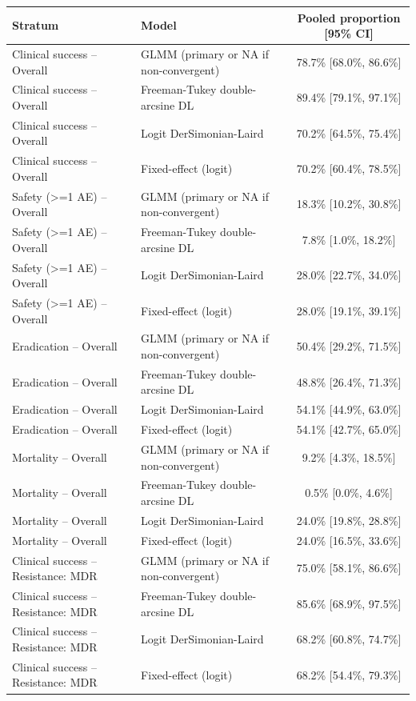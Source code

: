 \begin{tabular}{llc}
\toprule
Stratum & Model & Pooled proportion [95\% CI] \\
\midrule
Clinical success -- Overall & GLMM (primary or NA if non-convergent) & 78.7\% [68.0\%, 86.6\%] \\
Clinical success -- Overall & Freeman-Tukey double-arcsine DL & 89.4\% [79.1\%, 97.1\%] \\
Clinical success -- Overall & Logit DerSimonian-Laird & 70.2\% [64.5\%, 75.4\%] \\
Clinical success -- Overall & Fixed-effect (logit) & 70.2\% [60.4\%, 78.5\%] \\
Safety (>=1 AE) -- Overall & GLMM (primary or NA if non-convergent) & 18.3\% [10.2\%, 30.8\%] \\
Safety (>=1 AE) -- Overall & Freeman-Tukey double-arcsine DL & 7.8\% [1.0\%, 18.2\%] \\
Safety (>=1 AE) -- Overall & Logit DerSimonian-Laird & 28.0\% [22.7\%, 34.0\%] \\
Safety (>=1 AE) -- Overall & Fixed-effect (logit) & 28.0\% [19.1\%, 39.1\%] \\
Eradication -- Overall & GLMM (primary or NA if non-convergent) & 50.4\% [29.2\%, 71.5\%] \\
Eradication -- Overall & Freeman-Tukey double-arcsine DL & 48.8\% [26.4\%, 71.3\%] \\
Eradication -- Overall & Logit DerSimonian-Laird & 54.1\% [44.9\%, 63.0\%] \\
Eradication -- Overall & Fixed-effect (logit) & 54.1\% [42.7\%, 65.0\%] \\
Mortality -- Overall & GLMM (primary or NA if non-convergent) & 9.2\% [4.3\%, 18.5\%] \\
Mortality -- Overall & Freeman-Tukey double-arcsine DL & 0.5\% [0.0\%, 4.6\%] \\
Mortality -- Overall & Logit DerSimonian-Laird & 24.0\% [19.8\%, 28.8\%] \\
Mortality -- Overall & Fixed-effect (logit) & 24.0\% [16.5\%, 33.6\%] \\
Clinical success -- Resistance: MDR & GLMM (primary or NA if non-convergent) & 75.0\% [58.1\%, 86.6\%] \\
Clinical success -- Resistance: MDR & Freeman-Tukey double-arcsine DL & 85.6\% [68.9\%, 97.5\%] \\
Clinical success -- Resistance: MDR & Logit DerSimonian-Laird & 68.2\% [60.8\%, 74.7\%] \\
Clinical success -- Resistance: MDR & Fixed-effect (logit) & 68.2\% [54.4\%, 79.3\%] \\

\end{tabular}
